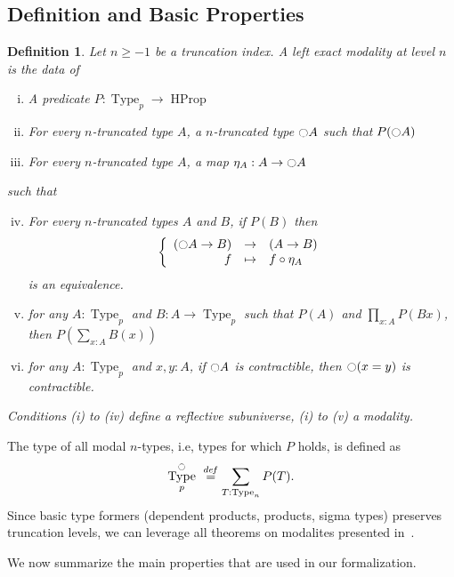 \documentclass[conference]{IEEEtran}
\newtheorem{defi}[thm]{Definition}
\newcommand \defeq {\overset{de\hspace{-0.2ex}f}{=}}
\newcommand{\ie}{i.e,\xspace}
\DeclareMathOperator{\Type}{Type}
\DeclareMathOperator{\HProp}{HProp}
\newcommand{\modal}{\ensuremath{\ocircle}}
\begin{document}
\subsection{Definition and Basic Properties}
\label{sec:definition}

\begin{defi}
  \label{sec:defin-basic-prop-1}
  Let $n\geq -1$ be a truncation index. A left exact modality at level
  $n$ is the data of
  \begin{enumerate}[(i)]
  \item A predicate $P:\Type_p \to \HProp$
  \item For every $n$-truncated type $A$, a $n$-truncated type
    $\modal A$ such that $P(\modal A)$
  \item For every $n$-truncated type $A$, a map $\eta_A:A \to
    \modal A$
  \end{enumerate}
  such that
  \begin{enumerate}[(i)]
    \setcounter{enumi}{3}
  \item For every $n$-truncated types $A$ and $B$, if $P(B)$ then
    $$\left\{
      \begin{array}{rcl}
        (\modal A \to B) & \to & (A \to B) \\
        f & \mapsto & f \circ \eta_A
      \end{array} \right.$$
    is an equivalence.
  \item for any $A:\Type_p$ and $B:A \to \Type_p$ such that $P(A)$
    and $\prod_{x:A} P(B x)$, then $P\left( \sum_{x:A} B(x)\right)$
  \item for any $A:\Type_p$ and $x,y:A$, if $\modal A$ is
    contractible, then $\modal (x=y)$ is contractible.
  \end{enumerate}
  Conditions (i) to (iv) define a {\em reflective subuniverse}, (i) to
  (v) a {\em modality}.
\end{defi}

The type of all modal $n$-types, \ie types for which $P$ holds, is
defined as %
$$
\Type^\modal_p \ \defeq \sum_{T : \Type_n} P (T).
$$
%
Since basic type formers (dependent products, products, sigma types)
preserves truncation levels, we can leverage all theorems on modalites
presented in~\cite[Chapter 7.7]{hottbook}.

We now summarize the main properties that are used in our
formalization.
 
\end{document}

